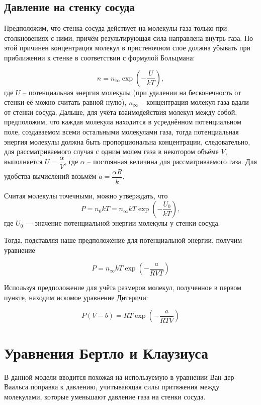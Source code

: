 \documentclass[12pt]{article} %
\begin{document}
\subsection*{Давление на стенку сосуда}

Предположим, что стенка сосуда действует на молекулы газа только при столкновениях с ними, причём результирующая сила направлена внутрь газа. 
По этой причинен концентрация молекул в пристеночном слое должна убывать при приближении к стенке в соответствии с формулой Больцмана:

\begin{equation}
n = n_\infty \exp\left(-\frac{U}{kT}\right),
\end{equation}
где $U$ -- потенциальная энергия молекулы (при удалении на бесконечность от стенки её можно считать равной нулю), $n_\infty$ -- концентрация молекул газа вдали от стенки сосуда.
Дальше, для учёта взаимодействия молекул между собой, предположим, что каждая молекула находится в усреднённом потенциальном поле, создаваемом всеми остальными молекулами газа, тогда потенциальная энергия молекулы должна быть пропорциональна концентрации, следовательно, для рассматриваемого случая с одним молем газа в некотором объёме $V$, выполняется $U = \dfrac{\alpha}{V}$, где $\alpha$ -- постоянная величина для рассматриваемого газа.
Для удобства вычислений возьмём $a = \dfrac{\alpha R}{k}$.

Считая молекулы точечными, можно утверждать, что
\begin{equation}
P = n_0kT = n_\infty kT\exp\left(-\frac{U_0}{kT}\right),
\end{equation}
где $U_0$ — значение потенциальной энергии молекулы у стенки сосуда.

Тогда, подставляя наше предположение для потенциальной энергии, получим уравнение

\begin{equation}
    P = n_\infty kT\exp\left(-\frac{a}{RVT}\right)
\end{equation}

Используя предположение для учёта размеров молекул, полученное в первом пункте, находим искомое уравнение Дитеричи:

\begin{equation}
P(V - b) = RT \exp\left(-\frac{a}{RTV}\right)
\end{equation}


\section*{Уравнения Бертло и Клаузиуса}
В данной модели вводится похожая на используемую в уравнении Ван-дер-Ваальса поправка к давлению, учитывающая силы притяжения между молекулами, которые уменьшают давление газа на стенки сосуда.
\end{document}
